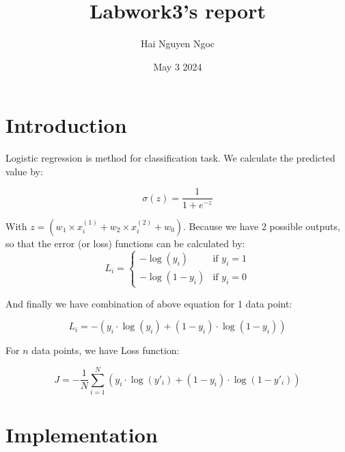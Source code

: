 \documentclass{article}
\title{Labwork3's report}
\author{Hai Nguyen Ngoc}
\date{May 3 2024}
\begin{document}
\maketitle

\section{Introduction}
Logistic regression is method for classification task. We calculate the predicted value by:

\begin{equation}
\sigma(z) = \frac{1}{1 + e^{-z}}
\end{equation}

With \(z = (w_1 \times x_{i}^{(1)} + w_2 \times x_{i}^{(2)} + w_0)\). Because we have 2 possible outputs, so that the error (or loss) functions can be calculated by:
\begin{equation}
L_i = 
\begin{cases} 
- \log(y_i) & \text{if } y_i = 1 \\
- \log(1 - y_i) & \text{if } y_i = 0 
\end{cases}
\end{equation}

And finally we have combination of above equation for 1 data point:

\begin{equation}
L_i = -(y_i \cdot \log(y_i) + (1 - y_i) \cdot \log(1 - y_i))
\end{equation}

For \(n\) data points, we have Loss function:

\begin{equation}
J = -\frac{1}{N} \sum_{i=1}^{N} \left( y_i \cdot \log(y'_i) + (1 - y_i) \cdot \log(1 - y'_i) \right)
\end{equation}

\section{Implementation}
\end{document}
